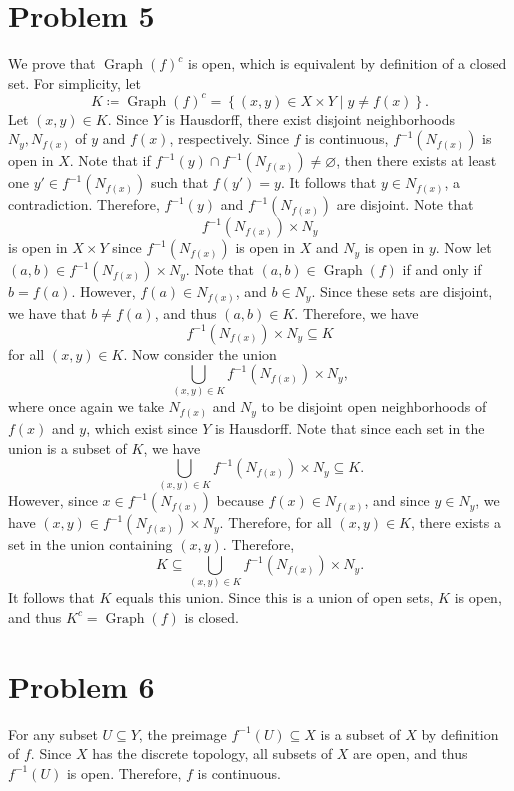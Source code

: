 \documentclass[11pt, letterpaper]{article}
\DeclareMathOperator{\Graph}{Graph}
\begin{document}
\section*{Problem 5}
We prove that $\Graph(f)^{c} $ is open, which is equivalent by definition of a closed set. For simplicity, let
\[
	K\coloneqq \Graph(f)^{c} =\left\{ (x,y)\in X\times Y\mid y\neq f(x) \right\} 
.\]
Let $(x,y)\in K$. Since $Y$ is Hausdorff, there exist disjoint neighborhoods $N_y,N_{f(x)} $ of $y$ and $f(x)$, respectively. Since $f$ is continuous, $f^{-1} \left( N_{f\left(x \right) }  \right) $ is open in $X$. Note that if $f^{-1} (y) \cap f^{-1} \left( N_{f(x)}  \right) \neq \varnothing $, then there exists at least one $y'\in f^{-1} \left( N_{f(x)}  \right) $ such that $f(y')=y$. It follows that $y\in N_{f(x)} $, a contradiction. Therefore, $f^{-1} (y)$ and $f^{-1} \left( N_{f(x)}  \right) $ are disjoint. Note that
\[
	f^{-1} \left( N_{f(x)}  \right) \times N_y
\]
is open in $X\times Y$ since $f^{-1} (N_{f(x)} )$ is open in $X$ and $N_y$ is open in $y$. Now let $(a,b)\in f^{-1} \left( N_{f(x)}  \right) \times N_y$. Note that $(a,b)\in \Graph(f)$ if and only if $b=f(a)$. However, $f(a)\in N_{f(x)} $, and $b\in N_y$. Since these sets are disjoint, we have that $b\neq f(a)$, and thus $(a,b)\in K$. Therefore, we have
\[
	f^{-1} \left( N_{f(x)}  \right) \times N_y \subseteq K
\]
for all $(x,y)\in K$. Now consider the union
\[
	\bigcup_{(x,y)\in K} f^{-1} \left( N_{f(x)}  \right) \times N_y
,\]
where once again we take $N_{f(x)} $ and $N_y$ to be disjoint open neighborhoods of $f(x)$ and $y$, which exist since $Y$ is Hausdorff. Note that since each set in the union is a subset of $K$, we have
\[
	\bigcup_{(x,y)\in K} f^{-1} \left( N_{f(x)}  \right) \times N_y \subseteq K
.\]
However, since $x\in f^{-1} \left( N_{f(x)}  \right) $ because $f(x)\in N_{f(x)} $, and since $y\in N_y$, we have $(x,y)\in f^{-1} \left( N_{f(x)}  \right) \times N_y$. Therefore, for all $(x,y)\in K$, there exists a set in the union containing $(x,y)$. Therefore,
\[
	K\subseteq \bigcup_{(x,y)\in K} f^{-1} \left( N_{f(x)}  \right) \times N_y
.\]
It follows that $K$ equals this union. Since this is a union of open sets, $K$ is open, and thus $K^{c} =\Graph(f)$ is closed.
\section*{Problem 6}
For any subset $U\subseteq Y$, the preimage $f^{-1} (U)\subseteq X$ is a subset of $X$ by definition of $f$. Since $X$ has the discrete topology, all subsets of $X$ are open, and thus $f^{-1} (U)$ is open. Therefore, $f$ is continuous.
\end{document}
